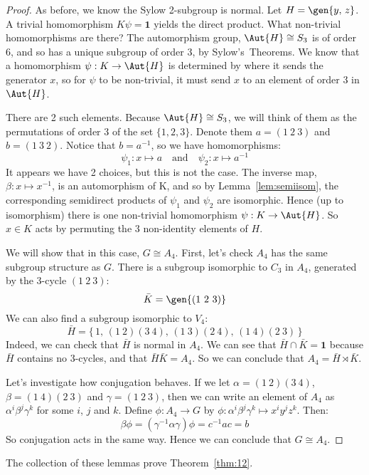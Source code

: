 \begin{proof}
    As before, we know the Sylow 2-subgroup is normal.
    Let \(H = \gen{y,\,z}\).
    A trivial homomorphism \(K\psi = \bm{1}\) yields the direct product.
    What non-trivial homomorphisms are there?
    The automorphism group, \(\Aut{H} \cong S_3\) is of order 6, and so has a unique subgroup of order 3, by
    Sylow's~Theorems.
    We know that a homomorphism \(\psi: K \to \Aut{H}\) is determined by where it sends the generator
    \(x\), so for \(\psi\) to be non-trivial, it must send \(x\) to an element of order 3 in \(\Aut{H}\).

    There are 2 such elements.
    Because \(\Aut{H} \cong S_3\), we will think of them as the permutations of order 3 of the set \(\{1, 2, 3\}\).
    Denote them \(a = (1\ 2\ 3)\) and \(b = (1\ 3\ 2)\).
    Notice that \(b = a^{-1}\), so we have homomorphisms:
    \[\psi_1:x \mapsto a \quad \text{and} \quad \psi_2:x \mapsto a^{-1}\]
    It appears we have 2 choices, but this is not the case.
    The inverse map, \(\beta:x \mapsto x^{-1}\), is an automorphism of K, and so by Lemma~\ref{lem:semiisom}, the
    corresponding semidirect products of \(\psi_1\) and \(\psi_2\) are isomorphic.
    Hence (up to isomorphism) there is one non-trivial homomorphism \(\psi:K \to \Aut{H}\).
    So \(x \in K\) acts by permuting the 3 non-identity elements of \(H\).

    We will show that in this case, \(G \cong A_4\).
    First, let's check \(A_4\) has the same subgroup structure as \(G\).
    There is a subgroup isomorphic to \(C_3\) in \(A_4\), generated by the 3-cycle \((1\ 2\ 3)\):
    \[\bar{K} = \gen{(1\ 2\ 3)}\]
    We can also find a subgroup isomorphic to \(V_4\):
    \[\bar{H} = \{\,1,\, (1\ 2)(3\ 4),\, (1\ 3)(2\ 4),\, (1\ 4)(2\ 3)\,\}\]
    Indeed, we can check that \(\bar{H}\) is normal in \(A_4\).
    We can see that \(\bar{H} \cap \bar{K} = \bm{1}\) because \(\bar{H}\) contains no 3-cycles, and that
    \(\bar{H}\bar{K} = A_4\).
    So we can conclude that \(A_4 = \bar{H} \rtimes \bar{K}\).

    Let's investigate how conjugation behaves.
    If we let \(\alpha = (1\ 2)(3\ 4)\), \(\beta = (1\ 4)(2\ 3)\) and \(\gamma = (1\ 2\ 3)\), then we can write an
    element of \(A_4\) as \(\alpha^i\beta^j\gamma^k\) for some \(i\), \(j\) and \(k\).
    Define \(\phi:A_4 \to G\) by \(\phi:\alpha^i\beta^j\gamma^k \mapsto x^{i}y^{j}z^{k}\).
    Then:
    \[\beta\phi = (\gamma^{-1}\alpha\gamma)\phi = c^{-1}ac = b\]
    So conjugation acts in the same way.
    Hence we can conclude that \(G \cong A_4\).
\end{proof}

The collection of these lemmas prove Theorem~\ref{thm:12}.
